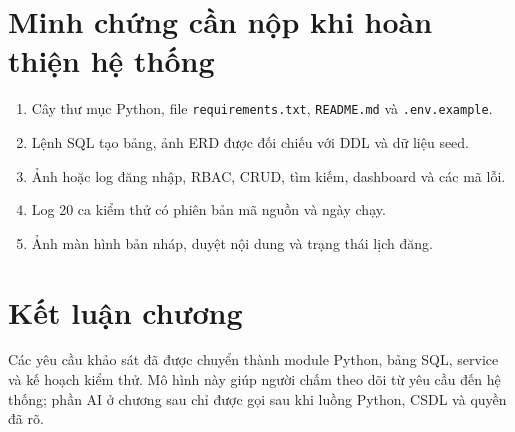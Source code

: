 \section{Minh chứng cần nộp khi hoàn thiện hệ thống}

\begin{enumerate}
  \item Cây thư mục Python, file \texttt{requirements.txt}, \texttt{README.md} và \texttt{.env.example}.
  \item Lệnh SQL tạo bảng, ảnh ERD được đối chiếu với DDL và dữ liệu seed.
  \item Ảnh hoặc log đăng nhập, RBAC, CRUD, tìm kiếm, dashboard và các mã lỗi.
  \item Log 20 ca kiểm thử có phiên bản mã nguồn và ngày chạy.
  \item Ảnh màn hình bản nháp, duyệt nội dung và trạng thái lịch đăng.
\end{enumerate}

\section{Kết luận chương}

Các yêu cầu khảo sát đã được chuyển thành module Python, bảng SQL, service và kế hoạch kiểm thử. Mô hình này giúp người chấm theo dõi từ yêu cầu đến hệ thống; phần AI ở chương sau chỉ được gọi sau khi luồng Python, CSDL và quyền đã rõ.
